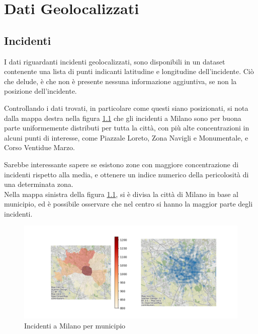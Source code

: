 \documentclass[a4paper]{report}
\begin{document}
\chapter{Dati Geolocalizzati}

\section{Incidenti}

I dati riguardanti incidenti geolocalizzati, sono disponibili in un dataset contenente una 
lista di punti indicanti latitudine e longitudine dell'incidente. 
Ciò che delude, è che non è presente nessuna informazione aggiuntiva, se non la posizione 
dell'incidente.

Controllando i dati trovati, in particolare come questi siano posizionati, 
si nota dalla mappa destra nella figura \ref{fig:heatmap-municipi} che gli incidenti a Milano 
sono per buona parte uniformemente distributi per tutta la città, 
con più alte concentrazioni in alcuni punti di interesse, come Piazzale Loreto, Zona Navigli 
e Monumentale, e Corso Ventidue Marzo.

Sarebbe interessante sapere se esistono zone con maggiore concentrazione di incidenti rispetto 
alla media, e ottenere un indice numerico della pericolosità di una determinata zona.\\

Nella mappa sinistra della figura \ref{fig:heatmap-municipi}, si è divisa la città di Milano 
in base al municipio, ed è possibile osservare che nel centro si hanno la maggior parte degli 
incidenti.

\begin{figure}
    \includegraphics[width=\linewidth]{../src/municipi_milano/incidenti_municipio.png}
    \caption{Incidenti a Milano per municipio}
    \label{fig:heatmap-municipi}
\end{figure}
\end{document}
